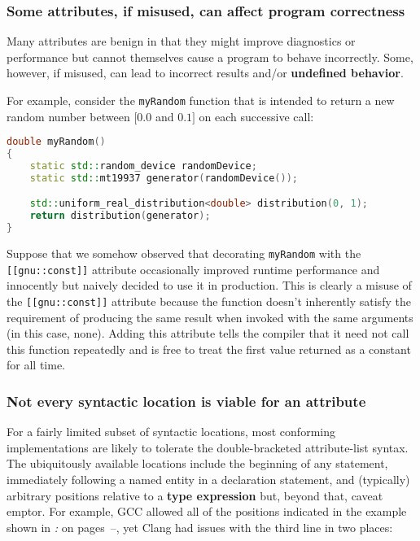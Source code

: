 \subsubsection[Some attributes, if misused, can affect program correctness]{Some attributes, if misused, can affect program correctness}\label{some-attributes,-if-misused,-can-affect-program-correctness}

Many attributes are benign in that they might improve diagnostics or
performance but cannot themselves cause a program to behave incorrectly.
Some, however, if misused, can lead to incorrect
results and/or \textbf{undefined behavior}.

For example, consider the \texttt{myRandom} function that is intended to
return a new random number between $[0.0$ and $0.1]$ on each successive
call:

\begin{lstlisting}[language=C++]
double myRandom()
{
    static std::random_device randomDevice;
    static std::mt19937 generator(randomDevice());

    std::uniform_real_distribution<double> distribution(0, 1);
    return distribution(generator);
}
\end{lstlisting}
    
\noindent Suppose that we somehow observed that decorating \texttt{myRandom} with
the \texttt{[[gnu::const]]} attribute occasionally improved runtime
performance and innocently but naively decided to use it in production. This
is clearly a misuse of the \texttt{[[gnu::const]]} attribute because the
function doesn't inherently satisfy the requirement of producing the
same result when invoked with the same arguments (in this case, none).
Adding this attribute tells the compiler that it need not call this
function repeatedly and is free to treat the first value returned as a
constant for all time.

\subsubsection[Not every syntactic location is viable for an attribute]{Not every syntactic location is viable for an attribute}\label{not-every-syntactic-location-is-viable-for-an-attribute}

For a fairly limited subset of syntactic locations, most
conforming implementations are likely to tolerate the double-bracketed
attribute-list syntax. The ubiquitously available locations include the
beginning of any statement, immediately following a named entity in a
declaration statement, and (typically) arbitrary positions relative to a
\textbf{type expression} but, beyond that, caveat emptor. For example, GCC
allowed all of the positions indicated in the example shown in
{\it{}:} {\it{}} on pages~\pageref{probing-where-attributes-are-permitted-in-the-compiler’s-c++-grammar}--\pageref{attribute-gcc-example}, yet Clang had
issues with the third line in two places:

